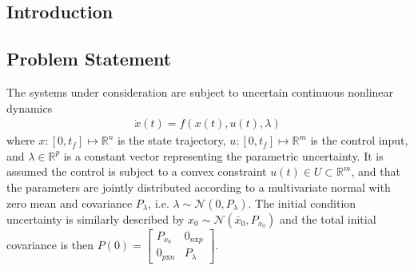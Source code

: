 \documentclass[10pt,a4paper]{article}
\begin{document}
	\subsection{Introduction}


		
	
		
	\subsection{Problem Statement}
	
	The systems under consideration are subject to uncertain continuous nonlinear dynamics 
	\begin{align}
	\dot{x}(t) = f(x(t),u(t),\lambda)
	\end{align}
	where $x:[0,t_f]\mapsto \mathbb{R}^n$ is the state trajectory, $u:[0,t_f]\mapsto \mathbb{R}^m$ is the control input, and $\lambda\in\mathbb{R}^p$ is a constant vector representing the parametric uncertainty. It is assumed the control is subject to a convex constraint $u(t) \in U \subset \mathbb{R}^m$, and that the parameters are jointly distributed according to a multivariate normal with zero mean and covariance $P_{\lambda}$, i.e. $\lambda \sim \mathcal{N}(0,P_{\lambda})$. The initial condition uncertainty is similarly described by $x_0 \sim \mathcal{N}(\bar{x}_0,P_{x_0})$ and the total initial covariance is then $P(0) = \left[\begin{array}{cc}
		P_{x_0}& 0_{n\mathrm{x}p} \\
		 0_{p\mathrm{x}n} & P_{\lambda}
		\end{array}\right]$.
	
\end{document}
